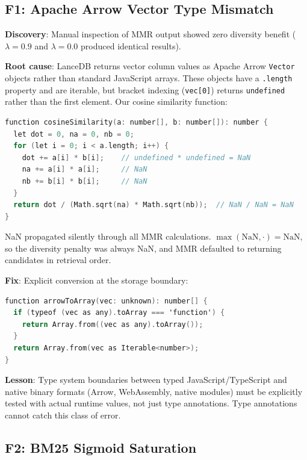 \documentclass[11pt]{article}
\begin{document}
\subsection{F1: Apache Arrow Vector Type Mismatch}
\label{sec:failures:F1}

\textbf{Discovery}: Manual inspection of MMR output showed zero diversity benefit
($\lambda=0.9$ and $\lambda=0.0$ produced identical results).

\textbf{Root cause}: LanceDB returns vector column values as Apache Arrow \texttt{Vector}
objects rather than standard JavaScript arrays. These objects have a \texttt{.length}
property and are iterable, but bracket indexing (\texttt{vec[0]}) returns
\texttt{undefined} rather than the first element. Our cosine similarity function:

\begin{lstlisting}[language=C]
function cosineSimilarity(a: number[], b: number[]): number {
  let dot = 0, na = 0, nb = 0;
  for (let i = 0; i < a.length; i++) {
    dot += a[i] * b[i];    // undefined * undefined = NaN
    na += a[i] * a[i];     // NaN
    nb += b[i] * b[i];     // NaN
  }
  return dot / (Math.sqrt(na) * Math.sqrt(nb));  // NaN / NaN = NaN
}
\end{lstlisting}

NaN propagated silently through all MMR calculations. $\max(\text{NaN}, \cdot) = \text{NaN}$,
so the diversity penalty was always NaN, and MMR defaulted to returning candidates in
retrieval order.

\textbf{Fix}: Explicit conversion at the storage boundary:

\begin{lstlisting}[language=C]
function arrowToArray(vec: unknown): number[] {
  if (typeof (vec as any).toArray === 'function') {
    return Array.from((vec as any).toArray());
  }
  return Array.from(vec as Iterable<number>);
}
\end{lstlisting}

\textbf{Lesson}: Type system boundaries between typed JavaScript/TypeScript and
native binary formats (Arrow, WebAssembly, native modules) must be explicitly tested
with actual runtime values, not just type annotations. Type annotations cannot catch
this class of error.

\subsection{F2: BM25 Sigmoid Saturation}
\label{sec:failures:F2}
\end{document}
